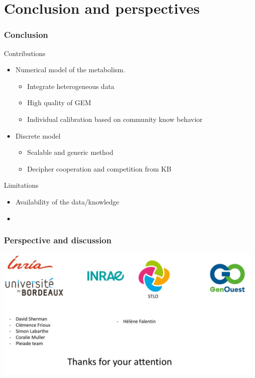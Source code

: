 \documentclass[8pt,usenames,dvipsnames]{beamer}
\begin{document}
\section{Conclusion and perspectives}
\begin{frame}
\frametitle{Conclusion}
\begin{block}{Contributions}
\begin{itemize}
\item Numerical model of the metabolism. 
\begin{itemize}
\item Integrate heterogeneous data
\item High quality of GEM
\item Individual calibration based on community know behavior
\end{itemize}
\end{itemize}
\begin{itemize}
\item Discrete model 
\begin{itemize}
\item Scalable and generic method
\item Decipher cooperation and competition from KB
\end{itemize}
\end{itemize}
\end{block}

\begin{block}{Limitations}
\begin{itemize}
\item Availability of the data/knowledge
\item 
\end{itemize}
\end{block}
\end{frame}

\begin{frame}
\frametitle{Perspective and discussion}
\end{frame}

\begin{frame}
\includegraphics[width=\textwidth]{figures/merci.pdf}
\end{frame}
\end{document}
